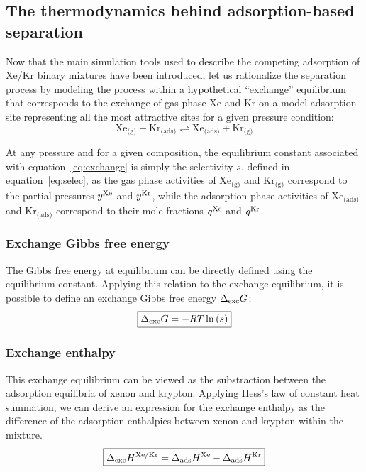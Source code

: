 \documentclass[main.tex]{subfiles}
\begin{document}
\subsection{The thermodynamics behind adsorption-based separation}\label{sct:thermo}

Now that the main simulation tools used to describe the competing adsorption of Xe/Kr binary mixtures have been introduced, let us rationalize the separation process by modeling the process within a hypothetical ``exchange'' equilibrium that corresponds to the exchange of gas phase Xe and Kr on a model adsorption site representing all the most attractive sites for a given pressure condition:
\begin{equation}\label{eq:exchange}
    \text{Xe}_{\text{(g)}} + \text{Kr}_{\text{(ads)}}
    \rightleftharpoons \text{Xe}_{\text{(ads)}} + \text{Kr}_{\text{(g)}}
\end{equation}

At any pressure and for a given composition, the equilibrium constant associated with equation~\ref{eq:exchange} is simply the selectivity $s$, defined in equation~\ref{eq:selec}, as the gas phase activities of $\text{Xe}_{\text{(g)}}$ and $\text{Kr}_{\text{(g)}}$ correspond to the partial pressures $y^{\text{Xe}}$ and $y^{\text{Kr}}$, while the adsorption phase activities of $\text{Xe}_{\text{(ads)}}$ and $\text{Kr}_{\text{(ads)}}$ correspond to their mole fractions $q^{\text{Xe}}$ and $q^{\text{Kr}}$. 

\subsubsection{Exchange Gibbs free energy}

The Gibbs free energy at equilibrium can be directly defined using the equilibrium constant. Applying this relation to the exchange equilibrium, it is possible to define an exchange Gibbs free energy $\Delta_{\text{exc}}G$:
\begin{equation}\label{eq:exc_gibbs_free_energy}
  \boxed{
  \Delta_{\text{exc}}G = -RT \ln\left(s\right)
  }
\end{equation}

\subsubsection{Exchange enthalpy}

This exchange equilibrium can be viewed as the substraction between the adsorption equilibria of xenon and krypton. Applying Hess's law of constant heat summation, we can derive an expression for the exchange enthalpy as the difference of the adsorption enthalpies between xenon and krypton within the mixture. 
\begin{equation}
  \boxed{
  \Delta_{\text{exc}}H^{\text{Xe/Kr}} = \Delta_{\text{ads}}H^{\text{Xe}} - \Delta_{\text{ads}}H^{\text{Kr}}
  }
\end{equation}
\end{document}
